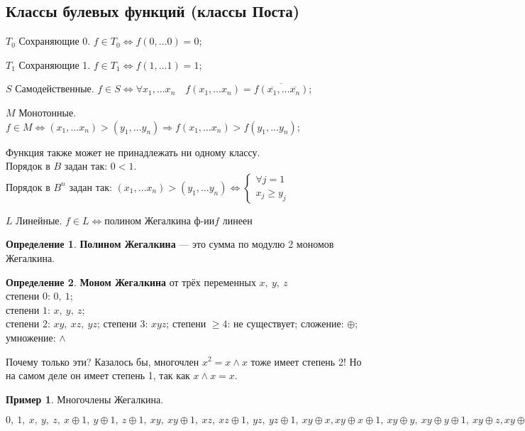 \documentclass[12pt,oneside]{article}
\theoremstyle{definition}
\newtheorem{definition}{Определение}
\newtheorem{exmp}{Пример}
\begin{document}
\subsection{Классы булевых функций (классы Поста)}

$T_0$ Сохраняющие 0. $f\in T_0 \Longleftrightarrow f(0,\dots 0) = 0$;

$T_1$ Сохраняющие 1. $f\in T_1 \Longleftrightarrow f(1,\dots 1) = 1$;

$S$ Самодейственные. $f\in S \Longleftrightarrow \forall x_1,\dots x_n\quad f(x_1,\dots x_n) = \overline{f(\overline{x_1},\dots \overline{x_n})}$;

$M$ Монотонные. $f\in M \Longleftrightarrow (x_1,\dots x_n) > (y_1,\dots y_n) \Longrightarrow f(x_1,\dots x_n) > f(y_1,\dots y_n)$;

Функция также может не принадлежать ни одному классу.\\
Порядок в $B$ задан так: $0<1$.\\
Порядок в $B^n$ задан так: $(x_1,\dots x_n) > (y_1,\dots y_n) \Longleftrightarrow \begin{cases}
\forall j = 1\\ %
x_j \geqslant y_j
\end{cases}$

$L$ Линейные. $f\in L \Longleftrightarrow \textrm{полином Жегалкина ф-ии} f \textrm{ линеен}$
\begin{definition}
\textbf{Полином Жегалкина} --- это сумма по модулю 2 мономов Жегалкина.
\end{definition}

\begin{definition}
\textbf{Моном Жегалкина} от трёх переменных $x,\ y,\ z$\\
степени $0$: $0,\ 1$;\\
степени $1$: $x,\ y,\ z$;\\
степени $2$: $xy,\ xz,\ yz$;
степени $3$: $xyz$;
степени $\geqslant 4$: не существует;
сложение: $\oplus$; умножение: $\wedge$
\end{definition}

Почему только эти? Казалось бы, многочлен $x^2 = x\wedge x$  тоже имеет степень 2! Но на самом деле он имеет степень 1, так как $x\wedge x = x$.

\begin{exmp}
Многочлены Жегалкина.

$0,\ 1,\ x,\ y,\ z,\ x\oplus 1,\ y\oplus 1,\ z\oplus 1,\ xy,\ xy\oplus 1,\ xz,\ xz\oplus 1,\ yz,\ yz\oplus 1,\ xy\oplus x, xy\oplus x\oplus 1,\ xy\oplus y,\ xy\oplus y\oplus 1,\ xy\oplus z, xy\oplus z\oplus 1,\dots$
\end{exmp}
\end{document}
